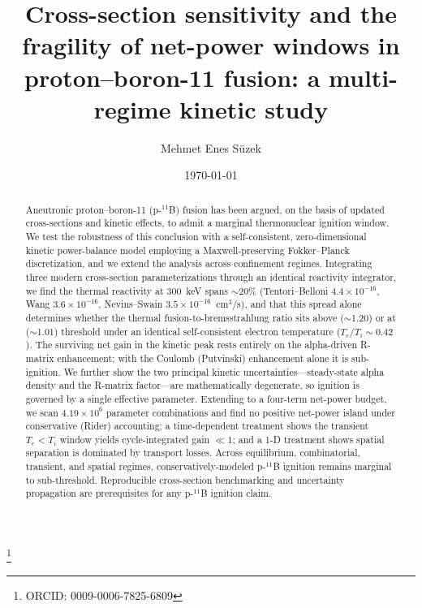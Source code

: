 \documentclass[aip,pop,reprint,amsmath,amssymb,floatfix]{revtex4-2}
\begin{document}
\title{Cross-section sensitivity and the fragility of net-power windows in proton--boron-11 fusion: a multi-regime kinetic study}

\author{Mehmet Enes S\"uzek}
\thanks{ORCID: 0009-0006-7825-6809}

\date{\today}

\begin{abstract}
Aneutronic proton--boron-11 (p-$^{11}$B) fusion has been argued, on the basis of updated cross-sections and kinetic effects, to admit a marginal thermonuclear ignition window. We test the robustness of this conclusion with a self-consistent, zero-dimensional kinetic power-balance model employing a Maxwell-preserving Fokker--Planck discretization, and we extend the analysis across confinement regimes. Integrating three modern cross-section parameterizations through an identical reactivity integrator, we find the thermal reactivity at 300~keV spans $\sim$20\% (Tentori--Belloni $4.4\times10^{-16}$, Wang $3.6\times10^{-16}$, Nevins--Swain $3.5\times10^{-16}$~cm$^3$/s), and that this spread alone determines whether the thermal fusion-to-bremsstrahlung ratio sits above ($\sim$1.20) or at ($\sim$1.01) threshold under an identical self-consistent electron temperature ($T_e/T_i \sim 0.42$). The surviving net gain in the kinetic peak rests entirely on the alpha-driven R-matrix enhancement; with the Coulomb (Putvinski) enhancement alone it is sub-ignition. We further show the two principal kinetic uncertainties---steady-state alpha density and the R-matrix factor---are mathematically degenerate, so ignition is governed by a single effective parameter. Extending to a four-term net-power budget, we scan $4.19\times10^6$ parameter combinations and find no positive net-power island under conservative (Rider) accounting; a time-dependent treatment shows the transient $T_e<T_i$ window yields cycle-integrated gain $\ll 1$; and a 1-D treatment shows spatial separation is dominated by transport losses. Across equilibrium, combinatorial, transient, and spatial regimes, conservatively-modeled p-$^{11}$B ignition remains marginal to sub-threshold. Reproducible cross-section benchmarking and uncertainty propagation are prerequisites for any p-$^{11}$B ignition claim.
\end{abstract}

\end{document}
